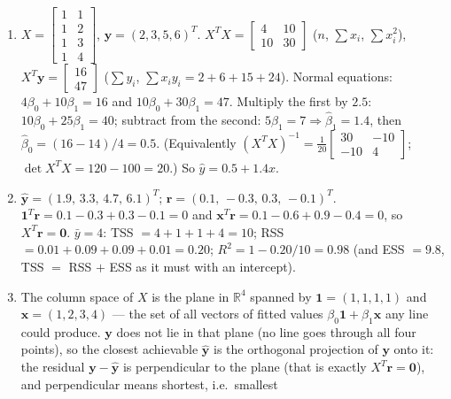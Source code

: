 \documentclass[
  11pt,
]{article}
\begin{document}
\begin{solutionbox}

\begin{enumerate}
\def\labelenumi{(\alph{enumi})}
\item
  \(X = \begin{bmatrix}1&1\\1&2\\1&3\\1&4\end{bmatrix}\),
  \(\mathbf y = (2,3,5,6)^T\).
  \(X^TX = \begin{bmatrix}4&10\\10&30\end{bmatrix}\) (\(n\),
  \(\sum x_i\), \(\sum x_i^2\)),
  \(X^T\mathbf y = \begin{bmatrix}16\\47\end{bmatrix}\) (\(\sum y_i\),
  \(\sum x_iy_i = 2+6+15+24\)). Normal equations:
  \(4\beta_0 + 10\beta_1 = 16\) and \(10\beta_0 + 30\beta_1 = 47\).
  Multiply the first by \(2.5\): \(10\beta_0 + 25\beta_1 = 40\);
  subtract from the second:
  \(5\beta_1 = 7 \Rightarrow \hat\beta_1 = 1.4\), then
  \(\hat\beta_0 = (16 - 14)/4 = 0.5\). (Equivalently
  \((X^TX)^{-1} = \tfrac{1}{20}\begin{bmatrix}30&-10\\-10&4\end{bmatrix}\);
  \(\det X^TX = 120-100 = 20\).) So \(\hat y = 0.5 + 1.4x\).
\item
  \(\hat{\mathbf y} = (1.9,\,3.3,\,4.7,\,6.1)^T\);
  \(\mathbf r = (0.1,\,-0.3,\,0.3,\,-0.1)^T\).
  \(\mathbf 1^T\mathbf r = 0.1-0.3+0.3-0.1 = 0\) and
  \(\mathbf x^T\mathbf r = 0.1 - 0.6 + 0.9 - 0.4 = 0\), so
  \(X^T\mathbf r = \mathbf 0\). \(\bar y = 4\): TSS \(= 4+1+1+4 = 10\);
  RSS \(= 0.01+0.09+0.09+0.01 = 0.20\); \(R^2 = 1 - 0.20/10 = 0.98\)
  (and ESS \(= 9.8\), TSS \(=\) RSS \(+\) ESS as it must with an
  intercept).
\item
  The column space of \(X\) is the plane in \(\mathbb R^4\) spanned by
  \(\mathbf 1 = (1,1,1,1)\) and \(\mathbf x = (1,2,3,4)\) --- the set of
  all vectors of fitted values \(\beta_0\mathbf 1 + \beta_1\mathbf x\)
  any line could produce. \(\mathbf y\) does not lie in that plane (no
  line goes through all four points), so the closest achievable
  \(\hat{\mathbf y}\) is the orthogonal projection of \(\mathbf y\) onto
  it: the residual \(\mathbf y - \hat{\mathbf y}\) is perpendicular to
  the plane (that is exactly \(X^T\mathbf r = \mathbf 0\)), and
  perpendicular means shortest, i.e.~smallest

\end{enumerate}
\end{solutionbox}
\end{document}
